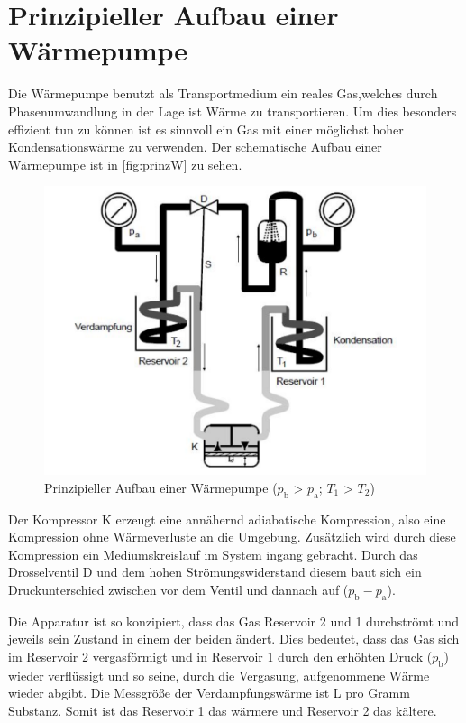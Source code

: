         \section{Prinzipieller Aufbau einer Wärmepumpe}
    	Die Wärmepumpe benutzt als Transportmedium ein reales Gas,welches durch Phasenumwandlung in der Lage ist Wärme zu transportieren. 
        Um dies besonders effizient tun zu können ist es sinnvoll ein Gas mit einer möglichst hoher Kondensationswärme zu verwenden. 
        Der schematische Aufbau einer Wärmepumpe ist in \autoref{fig:prinzW} zu sehen.
        \begin{figure}
            \centering
               \includegraphics[scale=0.75]{aufbau_1.pdf}
               \caption{Prinzipieller Aufbau einer Wärmepumpe ($p_\text{b}$ > $p_\text{a}$; $T_1$ > $T_2$)}
               \label{fig:prinzW}
        \end{figure}
        Der Kompressor K erzeugt eine annähernd adiabatische Kompression, also eine Kompression ohne Wärmeverluste an die Umgebung. 
        Zusätzlich wird durch diese Kompression ein Mediumskreislauf im System ingang gebracht. Durch das Drosselventil D und dem hohen Strömungswiderstand diesem baut sich ein Druckunterschied
        zwischen vor dem Ventil und dannach auf ($p_\text{b}-p_\text{a}$).

        Die Apparatur ist so konzipiert, dass das Gas Reservoir 2 und 1 durchströmt und jeweils sein Zustand in einem der beiden ändert. Dies bedeutet, dass das Gas sich im Reservoir 2 
        vergasförmigt und in Reservoir 1 durch den erhöhten Druck ($p_\text{b}$) wieder verflüssigt und so seine, durch die Vergasung, aufgenommene Wärme wieder abgibt. Die Messgröße der 
        Verdampfungswärme ist L pro Gramm Substanz.  Somit ist das Reservoir 1 das wärmere und Reservoir 2 das kältere.

